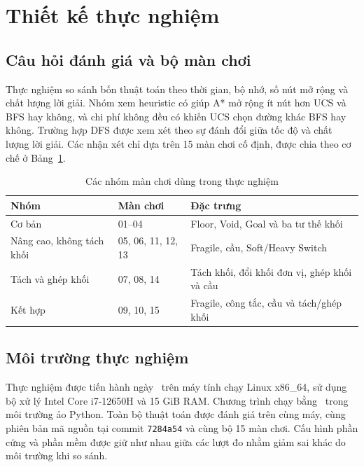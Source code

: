 \section{Thiết kế thực nghiệm}
\label{sec:experiment}

\subsection{Câu hỏi đánh giá và bộ màn chơi}

Thực nghiệm so sánh bốn thuật toán theo thời gian, bộ nhớ, số nút mở rộng và
chất lượng lời giải. Nhóm xem heuristic có giúp A* mở rộng ít nút hơn UCS và BFS
hay không, và chi phí không đều có khiến UCS chọn đường khác BFS hay không.
Trường hợp DFS được xem xét theo sự đánh đổi giữa tốc độ và chất lượng lời giải.
Các nhận xét chỉ dựa trên 15 màn chơi cố định, được chia theo cơ chế ở
Bảng~\ref{tab:level-groups}.

\begin{table}[H]
\centering
\caption{Các nhóm màn chơi dùng trong thực nghiệm}
\label{tab:level-groups}
\small
\begin{tabularx}{\textwidth}{@{}l l X@{}}
\toprule
\textbf{Nhóm} & \textbf{Màn chơi} & \textbf{Đặc trưng} \\
\midrule
Cơ bản & 01--04 & Floor, Void, Goal và ba tư thế khối \\
Nâng cao, không tách khối & 05, 06, 11, 12, 13 & Fragile, cầu, Soft/Heavy Switch \\
Tách và ghép khối & 07, 08, 14 & Tách khối, đổi khối đơn vị, ghép khối và cầu \\
Kết hợp & 09, 10, 15 & Fragile, công tắc, cầu và tách/ghép khối \\
\bottomrule
\end{tabularx}
\end{table}

\subsection{Môi trường thực nghiệm}

Thực nghiệm được tiến hành ngày \benchmarkdate\ trên máy tính chạy Linux
x86\_64, sử dụng bộ xử lý Intel Core i7-12650H và 15 GiB RAM. Chương trình
chạy bằng \benchmarkpython\ trong môi trường ảo Python. Toàn bộ thuật toán
được đánh giá trên cùng máy, cùng phiên bản mã nguồn tại commit
\texttt{7284a54} và cùng bộ 15 màn chơi.
Cấu hình phần cứng và phần mềm được giữ như nhau giữa các lượt đo nhằm giảm
sai khác do môi trường khi so sánh.

